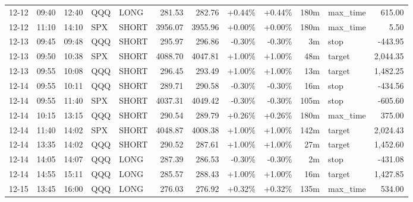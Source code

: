 \documentclass[11pt,a4paper]{article}
\begin{document}
\begin{center}
\begin{longtable}{>{\color{txtmain}}l l l l l r r r r r >{\color{txtmain}}l r}
12-12 & 09:40 & 12:40 & QQQ & LONG & 281.53 & 282.76 & \textcolor{wingreen}{+0.44\%} & \textcolor{wingreen}{+0.44\%} & 180m & max\_time & \textcolor{wingreen}{615.00} \\
12-12 & 11:10 & 14:10 & SPX & SHORT & 3956.07 & 3955.96 & \textcolor{wingreen}{+0.00\%} & \textcolor{wingreen}{+0.00\%} & 180m & max\_time & \textcolor{wingreen}{5.50} \\
12-13 & 09:45 & 09:48 & QQQ & SHORT & 295.97 & 296.86 & \textcolor{lossred}{-0.30\%} & \textcolor{lossred}{-0.30\%} & 3m & stop & \textcolor{lossred}{-443.95} \\
12-13 & 09:50 & 10:38 & SPX & SHORT & 4088.70 & 4047.81 & \textcolor{wingreen}{+1.00\%} & \textcolor{wingreen}{+1.00\%} & 48m & target & \textcolor{wingreen}{2,044.35} \\
12-13 & 09:55 & 10:08 & QQQ & SHORT & 296.45 & 293.49 & \textcolor{wingreen}{+1.00\%} & \textcolor{wingreen}{+1.00\%} & 13m & target & \textcolor{wingreen}{1,482.25} \\
12-14 & 09:55 & 10:11 & QQQ & SHORT & 289.71 & 290.58 & \textcolor{lossred}{-0.30\%} & \textcolor{lossred}{-0.30\%} & 16m & stop & \textcolor{lossred}{-434.56} \\
12-14 & 09:55 & 11:40 & SPX & SHORT & 4037.31 & 4049.42 & \textcolor{lossred}{-0.30\%} & \textcolor{lossred}{-0.30\%} & 105m & stop & \textcolor{lossred}{-605.60} \\
12-14 & 10:15 & 13:15 & QQQ & SHORT & 290.54 & 289.79 & \textcolor{wingreen}{+0.26\%} & \textcolor{wingreen}{+0.26\%} & 180m & max\_time & \textcolor{wingreen}{375.00} \\
12-14 & 11:40 & 14:02 & SPX & SHORT & 4048.87 & 4008.38 & \textcolor{wingreen}{+1.00\%} & \textcolor{wingreen}{+1.00\%} & 142m & target & \textcolor{wingreen}{2,024.43} \\
12-14 & 13:35 & 14:02 & QQQ & SHORT & 290.52 & 287.61 & \textcolor{wingreen}{+1.00\%} & \textcolor{wingreen}{+1.00\%} & 27m & target & \textcolor{wingreen}{1,452.60} \\
12-14 & 14:05 & 14:07 & QQQ & LONG & 287.39 & 286.53 & \textcolor{lossred}{-0.30\%} & \textcolor{lossred}{-0.30\%} & 2m & stop & \textcolor{lossred}{-431.08} \\
12-14 & 14:55 & 15:11 & QQQ & LONG & 285.57 & 288.43 & \textcolor{wingreen}{+1.00\%} & \textcolor{wingreen}{+1.00\%} & 16m & target & \textcolor{wingreen}{1,427.85} \\
12-15 & 13:45 & 16:00 & QQQ & LONG & 276.03 & 276.92 & \textcolor{wingreen}{+0.32\%} & \textcolor{wingreen}{+0.32\%} & 135m & max\_time & \textcolor{wingreen}{534.00} \\

\end{longtable}
\end{center}
\end{document}
